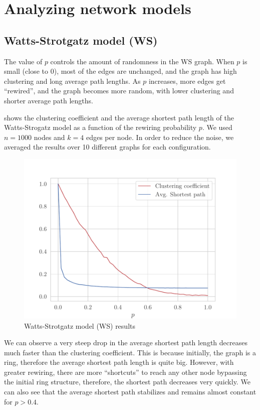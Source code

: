 \section{Analyzing network models}

\subsection{Watts-Strotgatz model (WS)}

The value of $p$ controls the amount of randomness in the
WS graph. When $p$ is small (close to 0), most of the edges are unchanged,
and the graph has high clustering and long average path lengths.
As $p$ increases, more edges get ``rewired'',
and the graph becomes more random, with lower clustering and
shorter average path lengths.

 shows the clustering coefficient and the average
shortest path length of the Watts-Strogatz model as a function of the
rewiring probability $p$. We used $n=1000$ nodes and $k=4$ edges per
node. In order to reduce the noise, we averaged the results over 10
different graphs for each configuration.

\begin{figure}[H]
    \includegraphics{figures/ws_model}
    \caption{Watts-Strotgatz model (WS) results}%
    \label{fig:ws_model}%
\end{figure}

We can observe a very steep drop in the average shortest path length
decreases much faster than the clustering coefficient. This is because
initially, the graph is a ring, therefore the average shortest path length is
quite big. However, with greater rewiring, there are more ``shortcuts'' to
reach any other node bypassing the initial ring structure, therefore, the shortest
path decreases very quickly. We can also see that the average shortest path stabilizes
and remains almost constant for $p>0.4$.

